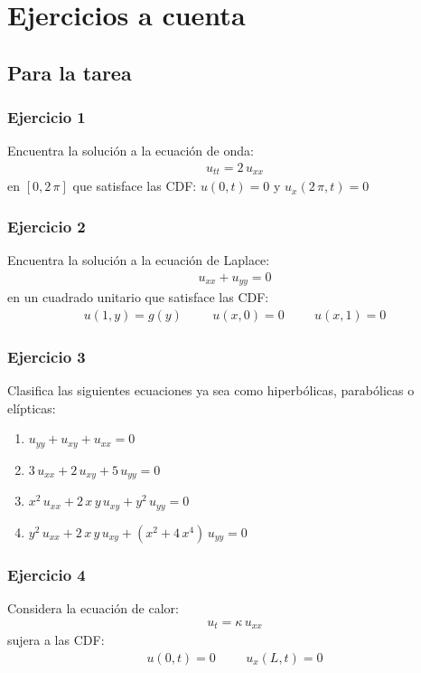 \documentclass[12pt]{beamer}
\begin{document}
\section{Ejercicios a cuenta}
\subsection{Para la tarea}

\begin{frame}
\frametitle{Ejercicio 1}
Encuentra la solución a la ecuación de onda:
\begin{align*}
  u_{tt} = 2 \, u_{xx} 
\end{align*}
en $[0, 2 \, \pi]$ que satisface las CDF: $u (0, t) = 0$ y $u_{x} (2 \, \pi, t) = 0$
\end{frame}
\begin{frame}
\frametitle{Ejercicio 2}
Encuentra la solución a la ecuación de Laplace:
\begin{align*}
  u_{xx} + u_{yy} = 0
\end{align*}
en un cuadrado unitario que satisface las CDF:
\begin{align*}
  u (1, y) = g (y) \hspace{1cm} u (x, 0) = 0  \hspace{1cm} u (x, 1) = 0
\end{align*}
\end{frame}
\begin{frame}
\frametitle{Ejercicio 3}
Clasifica las siguientes ecuaciones ya sea como hiperbólicas, parabólicas o elípticas:
\begin{enumerate}
\item $u_{yy} + u_{xy} + u_{xx} = 0$
\item $3 \, u_{xx} + 2 \, u_{xy} + 5 \, u_{yy} = 0$
\item $x^{2} \, u_{xx} + 2 \, x \, y \, u_{xy} + y^{2} \, u_{yy} = 0$
\item $y^{2} \, u_{xx} + 2 \, x \, y \, u_{xy} + \left( x^{2} + 4 \, x^{4} \right) \, u_{yy} = 0$
\end{enumerate}
\end{frame}
\begin{frame}
\frametitle{Ejercicio 4}
Considera la ecuación de calor:
\begin{align*}
  u_{t} = \kappa \, u_{xx}
\end{align*}
sujera a las CDF:
\begin{align*}
  u(0, t) = 0 \hspace{1cm} u_{x} (L, t) = 0
\end{align*}
\end{frame}
\end{document}

